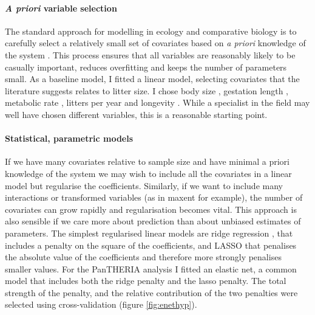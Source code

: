 \documentclass[10pt,]{article}
\let\oldparagraph\paragraph
\renewcommand{\paragraph}[1]{\oldparagraph{#1}\mbox{}}
\begin{document}
\paragraph{\texorpdfstring{\emph{A priori} variable selection}{A priori variable selection}}\label{a-priori-variable-selection}

The standard approach for modelling in ecology and comparative biology is to carefully select a relatively small set of covariates based on \emph{a priori} knowledge of the system \citep[ ]{whittingham2006we}. This process ensures that all variables are reasonably likely to be casually important, reduces overfitting and keeps the number of parameters small. As a baseline model, I fitted a linear model, selecting covariates that the literature suggests relates to litter size. I chose body size \citep{leutenegger1979evolution, tuomi1980mammalian}, gestation length \citep{okkens1993influence, bielby2007fast}, metabolic rate \citep{white2004does}, litters per year \citep{white2004does} and longevity \citep{wilkinson2002life, zammuto1986life}. While a specialist in the field may well have chosen different variables, this is a reasonable starting point.

\paragraph{Statistical, parametric models}\label{statistical-parametric-models}

If we have many covariates relative to sample size and have minimal a priori knowledge of the system we may wish to include all the covariates in a linear model but regularise the coefficients. Similarly, if we want to include many interactions or transformed variables (as in maxent \citep{maxent} for example), the number of covariates can grow rapidly and regularisation becomes vital. This approach is also sensible if we care more about prediction than about unbiased estimates of parameters. The simplest regularised linear models are ridge regression \citep{ridge}, that includes a penalty on the square of the coefficients, and LASSO \citep{tibshirani1996regression} that penalises the absolute value of the coefficients and therefore more strongly penalises smaller values. For the PanTHERIA analysis I fitted an elastic net, a common model that includes both the ridge penalty and the lasso penalty. The total strength of the penalty, and the relative contribution of the two penalties were selected using cross-validation (figure \ref{fig:enethyp}).
\end{document}
